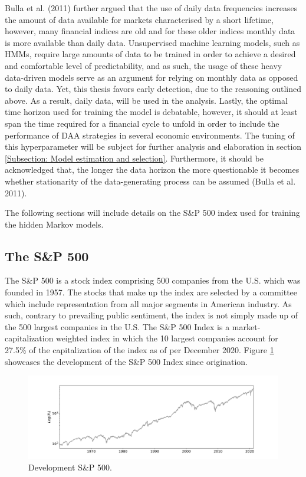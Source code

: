 Bulla et al. (2011) further argued that the use of daily data frequencies increases the amount of data available for markets characterised by a short lifetime, however, many financial indices are old and for these older indices monthly data is more available than daily data. Unsupervised machine learning models, such as HMMs, require large amounts of data to be trained in order to achieve a desired and comfortable level of predictability, and as such, the usage of these heavy data-driven models serve as an argument for relying on monthly data as opposed to daily data. Yet, this thesis favors early detection, due to the reasoning outlined above. As a result, daily data, will be used in the analysis. Lastly, the optimal time horizon used for training the model is debatable, however, it should at least span the time required for a financial cycle to unfold in order to include the performance of DAA strategies in several economic environments. The tuning of this hyperparameter will be subject for further analysis and elaboration in section \ref{Subsection: Model estimation and selection}. Furthermore, it should be acknowledged that, the longer the data horizon the more questionable it becomes whether stationarity of the data-generating process can be assumed (Bulla et al. 2011).

The following sections will include details on the S\&P 500 index used for training the hidden Markov models.
 
\subsection{The S\&P 500}
The S\&P 500 is a stock index comprising 500 companies from the U.S. which was founded in 1957. The stocks that make up the index are selected by a committee which include representation from all major segments in American industry. As such, contrary to prevailing public sentiment, the index is not simply made up of the 500 largest companies in the U.S. The S\&P 500 Index is a market-capitalization weighted index in which the 10 largest companies account for 27.5\% of the capitalization of the index as of per December 2020. Figure \ref{fig: SP500_index} showcases the development of the S\&P 500 Index since origination. 
 
\begin{figure}[H] 
    \centering
    \includegraphics[width=1\textwidth]{analysis/data_description/images/SP500_index.png}
    \caption{Development S\&P 500.}
    \label{fig: SP500_index}
\end{figure}

